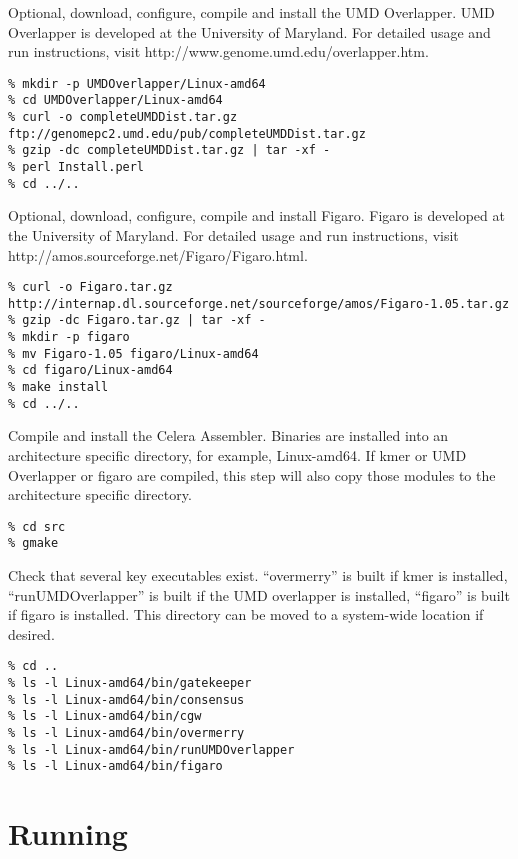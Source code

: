 \documentclass[twoside,11pt]{article}
\begin{document}
Optional, download, configure, compile and install the UMD Overlapper.  UMD Overlapper is developed at the University of Maryland. For detailed usage and run instructions, visit http://www.genome.umd.edu/overlapper.htm.

\begin{verbatim}
% mkdir -p UMDOverlapper/Linux-amd64
% cd UMDOverlapper/Linux-amd64
% curl -o completeUMDDist.tar.gz ftp://genomepc2.umd.edu/pub/completeUMDDist.tar.gz
% gzip -dc completeUMDDist.tar.gz | tar -xf -
% perl Install.perl
% cd ../..
\end{verbatim}

Optional, download, configure, compile and install Figaro.  Figaro is developed at the University of Maryland. For detailed usage and run instructions, visit http://amos.sourceforge.net/Figaro/Figaro.html.

\begin{verbatim}
% curl -o Figaro.tar.gz http://internap.dl.sourceforge.net/sourceforge/amos/Figaro-1.05.tar.gz
% gzip -dc Figaro.tar.gz | tar -xf -
% mkdir -p figaro
% mv Figaro-1.05 figaro/Linux-amd64
% cd figaro/Linux-amd64
% make install
% cd ../..
\end{verbatim}

Compile and install the Celera Assembler.  Binaries are installed into
an architecture specific directory, for example, Linux-amd64.  If kmer
or UMD Overlapper or figaro are compiled, this step will also copy those modules
to the architecture specific directory.

\begin{verbatim}
% cd src
% gmake
\end{verbatim}

Check that several key executables exist.  ``overmerry'' is built if
kmer is installed, ``runUMDOverlapper'' is built if the UMD overlapper
is installed, ``figaro'' is built if figaro is installed.  This directory 
can be moved to a system-wide location if desired.

\begin{verbatim}
% cd ..
% ls -l Linux-amd64/bin/gatekeeper
% ls -l Linux-amd64/bin/consensus
% ls -l Linux-amd64/bin/cgw
% ls -l Linux-amd64/bin/overmerry
% ls -l Linux-amd64/bin/runUMDOverlapper
% ls -l Linux-amd64/bin/figaro
\end{verbatim}

\section{Running}
\end{document}
